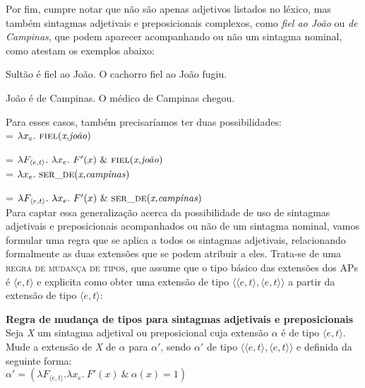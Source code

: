 Por fim, cumpre notar que não são apenas adjetivos listados no
léxico, mas também sintagmas adjetivais e preposicionais complexos, como
\textit{fiel ao João} ou \textit{de Campinas}, que podem aparecer acompanhando ou não um
sintagma nominal, como atestam os exemplos abaixo:

\begin{exe}
\ex\label{sas}
\begin{xlist}
\ex Sultão é fiel ao João.\label{sasa}
\ex O cachorro fiel ao João fugiu.\label{sasb}
\end{xlist}
\end{exe}

\begin{exe}
	\ex\label{sasp}
	\begin{xlist}
		\ex João é de Campinas.\label{sasap}
		\ex O médico de Campinas chegou.\label{sasbp}
	\end{xlist}
\end{exe}

\n Para esses casos, também precisaríamos ter duas possibilidades:\\

\n {} = $\lambda x_{e}.\ \predica{fiel}{x,joão}$

\n {} = $\lambda F_{\langle
e,t\rangle}.\ \lambda x_{e}.\ F'(x)\ \&\ \predica{fiel}{x,joão}$\\

\n {} = $\lambda x_{e}.\ \predica{ser\_de}{x,campinas}$

\n {} = $\lambda F_{\langle
	e,t\rangle}.\ \lambda x_{e}.\ F'(x)\ \&\ \predica{ser\_de}{x,campinas}$\\

\n Para captar essa generalização acerca da possibilidade de uso
de sintagmas adjetivais e preposicionais acompanhados ou não de um sintagma
nominal, vamos formular uma regra que se aplica a todos os
sintagmas adjetivais, relacionando formalmente as duas extensões
que se podem atribuir a eles. Trata-se de uma \textsc{regra de
mudança de tipos}, que assume que o tipo básico das extensões dos
APs é $\langle e,t\rangle$ e explicita como obter uma extensão de
tipo $\langle\langle e,t\rangle,\langle e,t\rangle\rangle$ a
partir da extensão de tipo $\langle e,t\rangle$:\\

\begin{tcolorbox}[boxrule=0pt,sharp corners]

\n \textbf{Regra de mudança de tipos para sintagmas adjetivais e preposicionais}\\
Seja \textit{X} um sintagma adjetival ou preposicional cuja extensão $\alpha$ é de
tipo $\langle e,t\rangle$. Mude a extensão de \textit{X} de
$\alpha$ para $\alpha '$, sendo $\alpha '$ de tipo $\langle\langle
e,t\rangle,\langle e,t\rangle\rangle$ e definida
da seguinte forma:\\

\n $\alpha ' = (\lambda F_{\langle e,t\rangle}.\lambda x_{e}.\ F'(x)\ \&\ \alpha(x) = 1)$

\end{tcolorbox}

